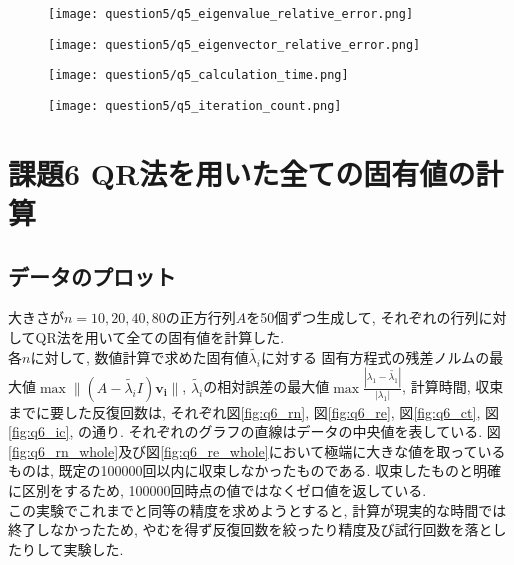 \documentclass[uplatex,a4j]{jsarticle}
\begin{document}
\begin{figure}[htbp]
  \centering

  \begin{minipage}[t]{0.48\textwidth}
    \centering
    \texttt{[image: question5/q5\_eigenvalue\_relative\_error.png]}
    \label{fig:q5_val_re}
  \end{minipage}
  \hfill
  \begin{minipage}[t]{0.48\textwidth}
    \centering
    \texttt{[image: question5/q5\_eigenvector\_relative\_error.png]}
    \label{fig:q5_vec_re}
  \end{minipage}
  
\end{figure}

\begin{figure}[htbp]
  \centering

  \begin{minipage}[t]{0.48\textwidth}
    \centering
    \texttt{[image: question5/q5\_calculation\_time.png]}
    \label{fig:q5_ct}
  \end{minipage}
  \hfill
  \begin{minipage}[t]{0.48\textwidth}
    \centering
    \texttt{[image: question5/q5\_iteration\_count.png]}
    \label{fig:q5_ic}
  \end{minipage}
  
\end{figure}


\section{課題6 QR法を用いた全ての固有値の計算}
\label{sec:q6}

\subsection{データのプロット}
\label{sec:q6_1}
大きさが$n = 10,20,40,80$の正方行列$A$を50個ずつ生成して, 
それぞれの行列に対してQR法を用いて全ての固有値を計算した. \\
各$n$に対して, 数値計算で求めた固有値$\tilde{\lambda_i}$に対する
固有方程式の残差ノルムの最大値$\max{\| (A - \tilde{\lambda_i}I) \bm{v_i} \| }$, 
$\tilde{\lambda_i}$の相対誤差の最大値$\max{\frac{|\lambda_1 - \tilde{\lambda_1}|}{|\lambda_1|}}$, 
計算時間, 収束までに要した反復回数は, 
それぞれ図\ref{fig:q6_rn}, 図\ref{fig:q6_re}, 図\ref{fig:q6_ct}, 図\ref{fig:q6_ic}, の通り. 
それぞれのグラフの直線はデータの中央値を表している. 
図\ref{fig:q6_rn_whole}及び図\ref{fig:q6_re_whole}において極端に大きな値を取っているものは, 
既定の100000回以内に収束しなかったものである. 
収束したものと明確に区別をするため, 100000回時点の値ではなくゼロ値を返している. \\
この実験でこれまでと同等の精度を求めようとすると, 計算が現実的な時間では終了しなかったため, 
やむを得ず反復回数を絞ったり精度及び試行回数を落としたりして実験した. 
\end{document}
